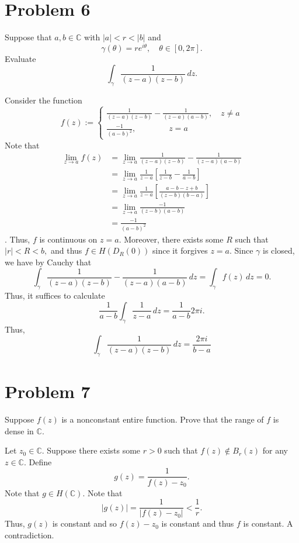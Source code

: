 \documentclass[11pt]{article}
\newcommand{\bbC}{\mathbb{C}}
\begin{document}
\newpage
\section*{Problem 6}
\begin{problem}
    Suppose that $a,b \in \bbC$ with $|a| < r < |b|$ and 
    \[\gamma(\theta) = re^{i\theta}, \quad \theta \in [0, 2\pi].\] Evaluate 
    \[\int_\gamma \frac{1}{(z - a)(z-b)}\, dz.\]
\end{problem}
\begin{solution}
    Consider the function
    \[f(z):= \begin{cases}
        \frac{1}{(z - a)(z-b)} - \frac{1}{(z-a)(a-b)}, \quad z\neq a\\
        \frac{-1}{(a-b)^2}, \qquad \qquad z = a
    \end{cases}\]
    Note that 
\begin{align*}
    \lim_{z\to a} f(z) &= \lim_{z\to a}\frac{1}{(z - a)(z-b)} - \frac{1}{(z-a)(a-b)}\\
    &= \lim_{z\to a} \frac{1}{z-a}\left[\frac{1}{z-b} - \frac{1}{a-b}\right]\\
    &= \lim_{z\to a} \frac{1}{z-a}\left[\frac{a-b - z + b}{(z-b)(b-a)}\right]\\
    &= \lim_{z\to a} \frac{-1}{(z-b)(a-b)}\\
    &= \frac{-1}{(a-b)^2}
\end{align*}. Thus, $f$ is continuous on $z = a.$ Moreover, there exists some $R$ such that $|r| < R < b,$ and thus $f\in H(D_R(0))$ since it forgives $z = a.$ Since $\gamma$ is closed, we have by Cauchy that 
\[\int_\gamma \frac{1}{(z - a)(z-b)} - \frac{1}{(z-a)(a-b)}\, dz = \int_\gamma f(z)\,dz = 0.\] Thus, it suffices to calculate 
\[\frac{1}{a-b}\int_\gamma \frac{1}{z - a}\,dz = \frac{1}{a-b}2\pi i.\] Thus, 
\[\int_\gamma \frac{1}{(z-a)(z-b)}\, dz = \frac{2\pi i}{b-a}\]
\end{solution}

\newpage
\section*{Problem 7}
\begin{problem}
    Suppose $f(z)$ is a nonconstant entire function. Prove that the range of $f$ is dense in $\bbC.$
\end{problem}
\begin{solution}
    Let $z_0\in \bbC.$ Suppose there exists some $r>0$ such that $f(z)\notin B_r(z)$ for any $z\in \bbC.$ Define 
    \[g(z) = \frac{1}{f(z) - z_0}.\] Note that $g \in H(\bbC).$ Note that 
    \[|g(z)| = \frac{1}{|f(z) - z_0|} < \frac{1}{r}.\] Thus, $g(z)$ is constant and so $f(z) - z_0$ is constant and thus $f$ is constant. A contradiction.
\end{solution}
\end{document}
